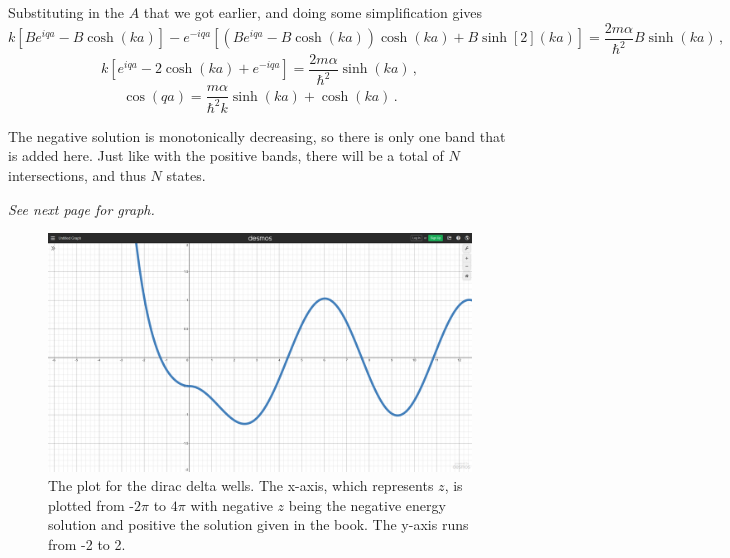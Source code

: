 \documentclass[11pt]{article}
\begin{document}
Substituting in the $A$ that we got earlier, and doing some simplification gives
\[k\left[Be^{iqa} - B\cosh(ka)\right]-e^{-iqa}\left[\left(Be^{iqa} - B\cosh(ka)\right)\cosh(ka) + B \sinh[2](ka)\right] = \frac{2m\alpha}{\hbar^2}B\sinh(ka) \, ,\]
\[k\left[e^{iqa} - 2\cosh(ka) + e^{-iqa}\right] = \frac{2m\alpha}{\hbar^2}\sinh(ka) \, ,\]
\[\boxed{\cos(qa) = \frac{m\alpha}{\hbar^2 k} \sinh(ka) + \cosh(ka)} \, .\]

The negative solution is monotonically decreasing, so there is only one band that is added here. Just like with the positive bands, there will be a total of $N$ intersections, and thus $N$ states.

\vfill
\textit{See next page for graph.}

\begin{figure}[!ht]
\centering
	\includegraphics[width=0.9\linewidth]{phsx462_hw07_01.PNG}
	\caption{The plot for the dirac delta wells. The x-axis, which represents $z$, is plotted from -$2\pi$ to $4\pi$ with negative $z$ being the negative energy solution and positive the solution given in the book. The y-axis runs from -2 to 2.}
	\label{fig:6.1}
\end{figure}
\end{document}
